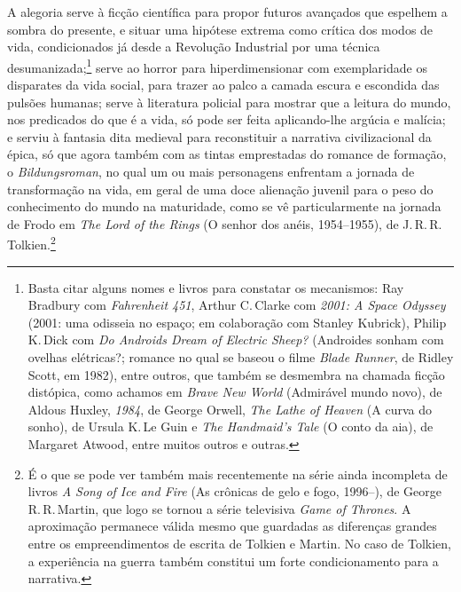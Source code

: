 A alegoria serve à ficção científica para propor futuros
avançados que espelhem a sombra do presente, e situar uma
hipótese extrema como crítica dos modos de vida, condicionados já desde
a Revolução Industrial por uma técnica desumanizada;\footnote{Basta
  citar alguns nomes e livros para constatar os mecanismos: Ray
  Bradbury com \emph{Fahrenheit 451}, Arthur C.\,Clarke com \emph{2001: A
  Space Odyssey} (2001: uma odisseia no espaço; em colaboração com Stanley Kubrick), Philip K.\,Dick
  com \emph{Do Androids Dream of Electric Sheep?} (Androides sonham com ovelhas elétricas?; romance no qual se baseou o filme \emph{Blade Runner}, de Ridley Scott, em 1982), entre outros,
  que também se desmembra na chamada ficção distópica, como
  achamos em \emph{Brave New World} (Admirável mundo novo), de Aldous Huxley, \emph{1984}, de
  George Orwell, \emph{The Lathe of Heaven} (A curva do sonho), de Ursula K.\,Le Guin e
  \emph{The Handmaid's Tale} (O conto da aia), de Margaret Atwood, entre muitos outros e
  outras.} serve ao horror para hiperdimensionar com exemplaridade os
disparates da vida social, para trazer ao palco a camada escura e
escondida das pulsões humanas; serve à literatura policial para mostrar
que a leitura do mundo, nos predicados do que é a vida, só pode ser feita
aplicando-lhe argúcia e malícia; e serviu à fantasia dita
medieval para reconstituir a narrativa civilizacional da épica,
só que agora também com as tintas emprestadas do romance de formação, o
\emph{Bildungsroman}, no qual um ou mais personagens enfrentam a jornada
de transformação na vida, em geral de uma doce alienação juvenil para o
peso do conhecimento do mundo na maturidade, como se vê particularmente
na jornada de Frodo em \emph{The Lord of the Rings} (O senhor dos anéis, 1954--1955), de J.\,R.\,R.\,Tolkien.\footnote{É o que se pode ver também mais
  recentemente na série ainda incompleta de livros \emph{A Song of Ice
  and Fire} (As crônicas de gelo e fogo, 1996--), de George R.\,R.\,Martin, que logo se tornou
  a série televisiva \emph{Game of Thrones}. A aproximação permanece
  válida mesmo que guardadas as diferenças grandes entre os
  empreendimentos de escrita de Tolkien e Martin. No caso de Tolkien, a
  experiência na guerra também constitui um forte condicionamento para a
  narrativa.}

